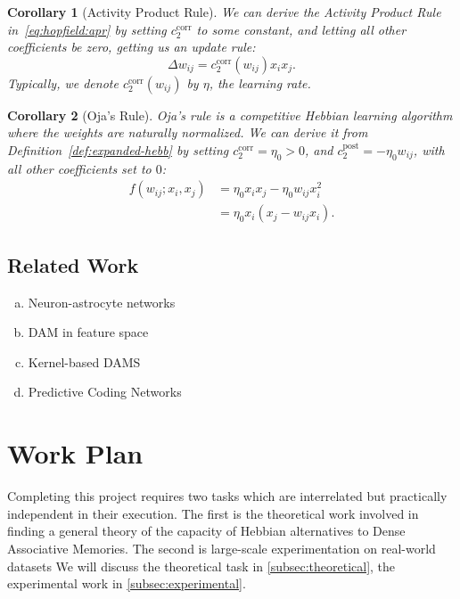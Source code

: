 \documentclass{article}
\newtheorem{corollary}{Corollary}[subsection]
\theoremstyle{definition}
\begin{document}
\begin{corollary}[Activity Product Rule]
  We can derive the Activity Product Rule in~\autoref{eq:hopfield:apr}
  by setting $c_2^\text{corr}$ to some constant, and letting all other
  coefficients be zero, getting us an update rule:
  $$
  \Delta w_{ij} = c_2^\text{corr} (w_{ij}) x_i x_j.
  $$
  Typically, we denote $c_2^\text{corr} (w_{ij})$ by $\eta$,
  the \textit{learning rate}.
\end{corollary}

\begin{corollary}[Oja's Rule]
  \textit{Oja's rule} \parencite{oja_simplified_1982} is a competitive Hebbian
  learning algorithm where the weights are naturally normalized. We can
  derive it from Definition~\ref{def:expanded-hebb} by setting
  $c_2^\text{corr} = \eta_0 > 0$,
  and $c_2^\text{post} = - \eta_0 w_{ij}$, with all other
  coefficients set to $0$:
  \begin{align*}
    f(w_{ij}; x_i, x_j) &= \eta_0 x_i x_j - \eta_0 w_{ij} x_i^2 \\
    &= \eta_0 x_i (x_j - w_{ij} x_i).
  \end{align*}
\end{corollary}

\subsection{Related Work}\label{sec:related-work}

\begin{enumerate}[(a)]
  \item Neuron-astrocyte networks
  \item DAM in feature space
  \item Kernel-based DAMS
  \item Predictive Coding Networks
\end{enumerate}

\section{Work Plan}

Completing this project requires two tasks which are interrelated but
practically independent in their execution. The first is the theoretical
work involved in finding a general theory of the capacity of Hebbian
alternatives
to Dense Associative Memories. The second is large-scale experimentation
on real-world datasets We will discuss the theoretical task in
\autoref{subsec:theoretical},
the experimental work in \autoref{subsec:experimental}.
\end{document}
